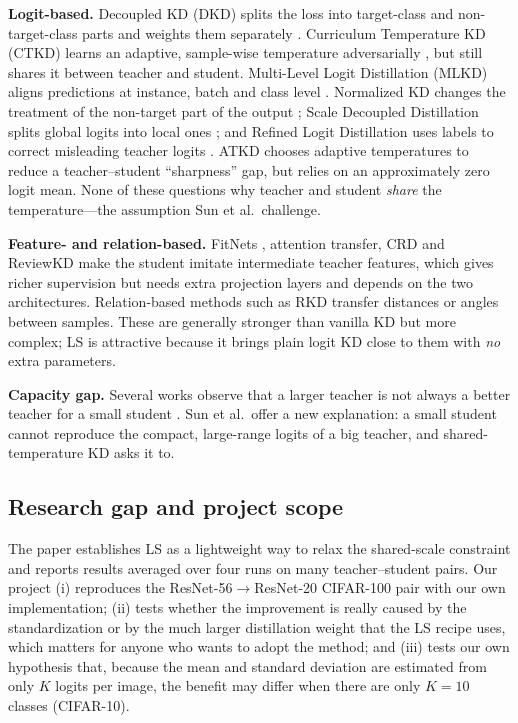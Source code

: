 \documentclass[12pt,a4paper]{article}
\begin{document}
\textbf{Logit-based.} Decoupled KD (DKD) splits the loss into target-class and non-target-class parts and weights them separately \cite{zhao2022}. Curriculum Temperature KD (CTKD) learns an adaptive, sample-wise temperature adversarially \cite{li2023}, but still shares it between teacher and student. Multi-Level Logit Distillation (MLKD) aligns predictions at instance, batch and class level \cite{jin2023}. Normalized KD changes the treatment of the non-target part of the output \cite{yang2023}; Scale Decoupled Distillation splits global logits into local ones \cite{wei2024}; and Refined Logit Distillation uses labels to correct misleading teacher logits \cite{sun2025}. ATKD \cite{guo2022} chooses adaptive temperatures to reduce a teacher--student ``sharpness'' gap, but relies on an approximately zero logit mean. None of these questions why teacher and student \emph{share} the temperature---the assumption Sun et al.\ challenge.

\textbf{Feature- and relation-based.} FitNets \cite{romero2015}, attention transfer, CRD \cite{tian2020} and ReviewKD \cite{chen2021} make the student imitate intermediate teacher features, which gives richer supervision but needs extra projection layers and depends on the two architectures. Relation-based methods such as RKD \cite{park2019} transfer distances or angles between samples. These are generally stronger than vanilla KD but more complex; LS is attractive because it brings plain logit KD close to them with \emph{no} extra parameters.

\textbf{Capacity gap.} Several works observe that a larger teacher is not always a better teacher for a small student \cite{cho2019,mirzadeh2020}. Sun et al.\ offer a new explanation: a small student cannot reproduce the compact, large-range logits of a big teacher, and shared-temperature KD asks it to.

\subsection{Research gap and project scope}
The paper establishes LS as a lightweight way to relax the shared-scale constraint and reports results averaged over four runs on many teacher--student pairs. Our project (i) reproduces the ResNet-56$\rightarrow$ResNet-20 CIFAR-100 pair with our own implementation; (ii) tests whether the improvement is really caused by the standardization or by the much larger distillation weight that the LS recipe uses, which matters for anyone who wants to adopt the method; and (iii) tests our own hypothesis that, because the mean and standard deviation are estimated from only $K$ logits per image, the benefit may differ when there are only $K{=}10$ classes (CIFAR-10).
\end{document}
